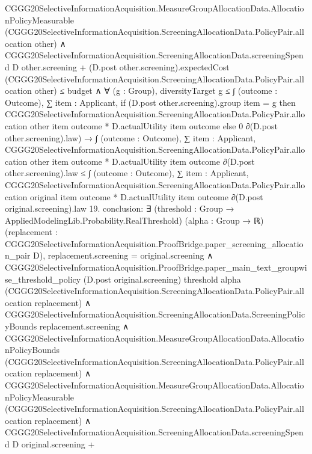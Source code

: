 \documentclass[10pt]{article}
\begin{document}
\begin{ReviewVerbatim}
          CGGG20SelectiveInformationAcquisition.MeasureGroupAllocationData.AllocationPolicyMeasurable
              (CGGG20SelectiveInformationAcquisition.ScreeningAllocationData.PolicyPair.allocation other) ∧
            CGGG20SelectiveInformationAcquisition.ScreeningAllocationData.screeningSpend D other.screening +
                  (D.post other.screening).expectedCost
                    (CGGG20SelectiveInformationAcquisition.ScreeningAllocationData.PolicyPair.allocation other) ≤
                budget ∧
              ∀ (g : Group),
                diversityTarget g ≤
                  ∫ (outcome : Outcome),
                    ∑ item : Applicant,
                      if (D.post other.screening).group item = g then
                        CGGG20SelectiveInformationAcquisition.ScreeningAllocationData.PolicyPair.allocation other item
                            outcome *
                          D.actualUtility item outcome
                      else 0 ∂(D.post other.screening).law) →
      ∫ (outcome : Outcome),
          ∑ item : Applicant,
            CGGG20SelectiveInformationAcquisition.ScreeningAllocationData.PolicyPair.allocation other item outcome *
              D.actualUtility item outcome ∂(D.post other.screening).law ≤
        ∫ (outcome : Outcome),
          ∑ item : Applicant,
            CGGG20SelectiveInformationAcquisition.ScreeningAllocationData.PolicyPair.allocation original item outcome *
              D.actualUtility item outcome ∂(D.post original.screening).law
19. conclusion: ∃ (threshold : Group → AppliedModelingLib.Probability.RealThreshold) (alpha : Group → ℝ) (replacement :
  CGGG20SelectiveInformationAcquisition.ProofBridge.paper_screening_allocation_pair D),
  replacement.screening = original.screening ∧
    CGGG20SelectiveInformationAcquisition.ProofBridge.paper_main_text_groupwise_threshold_policy
        (D.post original.screening) threshold alpha
        (CGGG20SelectiveInformationAcquisition.ScreeningAllocationData.PolicyPair.allocation replacement) ∧
      CGGG20SelectiveInformationAcquisition.ScreeningAllocationData.ScreeningPolicyBounds replacement.screening ∧
        CGGG20SelectiveInformationAcquisition.MeasureGroupAllocationData.AllocationPolicyBounds
            (CGGG20SelectiveInformationAcquisition.ScreeningAllocationData.PolicyPair.allocation replacement) ∧
          CGGG20SelectiveInformationAcquisition.MeasureGroupAllocationData.AllocationPolicyMeasurable
              (CGGG20SelectiveInformationAcquisition.ScreeningAllocationData.PolicyPair.allocation replacement) ∧
            CGGG20SelectiveInformationAcquisition.ScreeningAllocationData.screeningSpend D original.screening +

\end{ReviewVerbatim}
\end{document}

